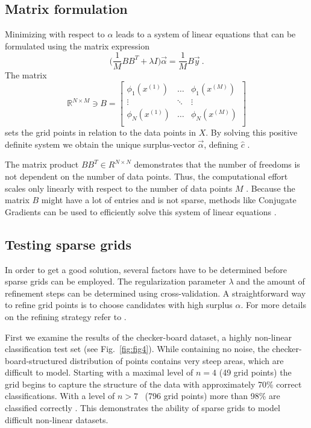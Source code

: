 \subsection{Matrix formulation}
Minimizing with respect to $\alpha$ leads to a system of linear equations that
can be formulated using the matrix expression
$$\Big(\frac{1}{M} BB^T + \lambda I \Big)\vec{\alpha} = \frac{1}{M}B\vec{y} \
.$$
The matrix
$$ \mathbb{R}^{N \times M} \ni B =
\begin{bmatrix}
  \phi_1(x^{(1)}) & \dots & \phi_1(x^{(M)}) \\
  \vdots & \ddots & \vdots \\
  \phi_N(x^{(1)}) & \dots  & \phi_N(x^{(M)}) \\
\end{bmatrix}
$$
sets the grid points in relation to the data points in $X$. By solving this
positive definite system we obtain the unique surplus-vector
$\vec{\alpha}$, defining $\hat{c}$ \cite{disshei}.
\par
The
matrix product $BB^T \in R^{N \times N}$ demonstrates that the number of freedoms
is not dependent on the number of data points. Thus, the computational effort
scales only linearly with respect to the number of data points $M$ \cite{disspfl}. Because
the matrix $B$ might have a lot of entries and is not sparse, methods like
Conjugate Gradients can be used to efficiently solve this system
of linear equations \cite{disshei}.

\subsection{Testing sparse grids}\label{subsec:test}
In order to get a good solution, several factors have to be determined before
sparse grids can be employed. The regularization parameter $\lambda$ and the
amount of refinement steps can be determined using cross-validation.
A straightforward way to refine grid points is to choose candidates
with high surplus $\alpha$. %
For more
details on the refining strategy refer to \cite{disspfl}.
\par
First we examine the results of the checker-board dataset, a highly non-linear
classification test set (see Fig.~\ref{fig:fig4}).
While containing no noise, the checker-board-structured
distribution of points contains very steep areas, which are difficult to model.
Starting with a maximal level of $n=4$ (49 grid points)
the grid begins to capture the structure of the data with approximately
70\% correct classifications.
With a level of $n>7$ \ (796 grid points) more than 98\% are classified
correctly \cite{disspfl}. This demonstrates the ability of sparse grids
to model difficult non-linear datasets.
\par

